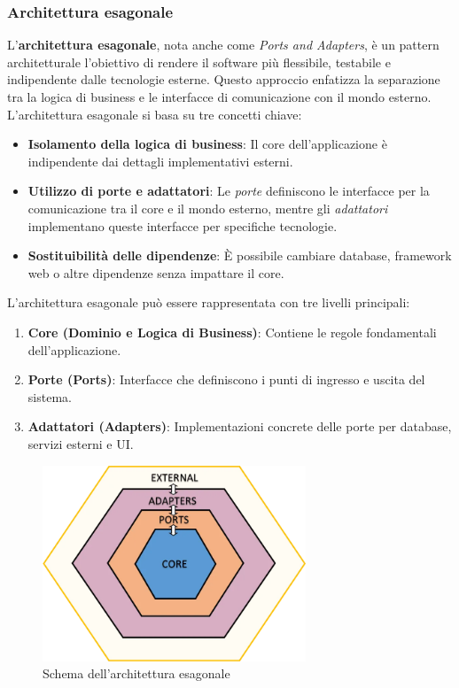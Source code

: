 \subsubsection{Architettura esagonale}
L’\textbf{architettura esagonale}, nota anche come \textit{Ports and Adapters}, è un pattern architetturale l'obiettivo di rendere il software più flessibile, testabile e indipendente dalle tecnologie esterne. Questo approccio enfatizza la separazione tra la logica di business e le interfacce di comunicazione con il mondo esterno.
L'architettura esagonale si basa su tre concetti chiave:
\begin{itemize}
    \item \textbf{Isolamento della logica di business}: Il core dell'applicazione è indipendente dai dettagli implementativi esterni.
    \item \textbf{Utilizzo di porte e adattatori}: Le \textit{porte} definiscono le interfacce per la comunicazione tra il core e il mondo esterno, mentre gli \textit{adattatori} implementano queste interfacce per specifiche tecnologie.
    \item \textbf{Sostituibilità delle dipendenze}: È possibile cambiare database, framework web o altre dipendenze senza impattare il core.
\end{itemize}

L’architettura esagonale può essere rappresentata con tre livelli principali:
\begin{enumerate}
    \item \textbf{Core (Dominio e Logica di Business)}: Contiene le regole fondamentali dell’applicazione.
    \item \textbf{Porte (Ports)}: Interfacce che definiscono i punti di ingresso e uscita del sistema.
    \item \textbf{Adattatori (Adapters)}: Implementazioni concrete delle porte per database, servizi esterni e UI.
\end{enumerate}
\begin{figure}[H]
    \centering
    \includegraphics[width=0.7\textwidth]{./img/hexagonal_architecture.png}
    \caption{Schema dell'architettura esagonale}
    \label{fig:hex_arch}
\end{figure}

